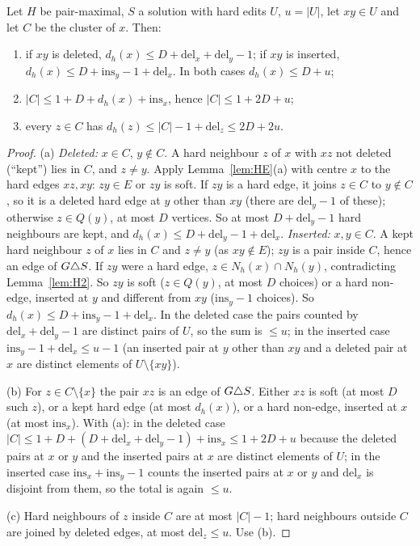\begin{lemma}\label{lem:EX}
Let $H$ be pair-maximal, $S$ a solution with hard edits $U$, $u=|U|$, let $xy\in U$ and let $C$ be the cluster of $x$. Then:
\begin{enumerate}
\item[(a)] if $xy$ is deleted, $d_h(x)\le D+\mathrm{del}_x+\mathrm{del}_y-1$; if $xy$ is inserted, $d_h(x)\le D+\mathrm{ins}_y-1+\mathrm{del}_x$. In both cases $d_h(x)\le D+u$;
\item[(b)] $|C|\le1+D+d_h(x)+\mathrm{ins}_x$, hence $|C|\le1+2D+u$;
\item[(c)] every $z\in C$ has $d_h(z)\le|C|-1+\mathrm{del}_z\le2D+2u$.
\end{enumerate}
\end{lemma}
\begin{proof}
(a) \emph{Deleted:} $x\in C$, $y\notin C$. A hard neighbour $z$ of $x$ with $xz$ not deleted (``kept'') lies in $C$, and $z\ne y$. Apply Lemma~\ref{lem:HE}(a) with centre $x$ to the hard edges $xz,xy$: $zy\in E$ or $zy$ is soft. If $zy$ is a hard edge, it joins $z\in C$ to $y\notin C$, so it is a deleted hard edge at $y$ other than $xy$ (there are $\mathrm{del}_y-1$ of these); otherwise $z\in Q(y)$, at most $D$ vertices. So at most $D+\mathrm{del}_y-1$ hard neighbours are kept, and $d_h(x)\le D+\mathrm{del}_y-1+\mathrm{del}_x$. \emph{Inserted:} $x,y\in C$. A kept hard neighbour $z$ of $x$ lies in $C$ and $z\ne y$ (as $xy\notin E$); $zy$ is a pair inside $C$, hence an edge of $G\triangle S$. If $zy$ were a hard edge, $z\in N_h(x)\cap N_h(y)$, contradicting Lemma~\ref{lem:H2}. So $zy$ is soft ($z\in Q(y)$, at most $D$ choices) or a hard non-edge, inserted at $y$ and different from $xy$ ($\mathrm{ins}_y-1$ choices). So $d_h(x)\le D+\mathrm{ins}_y-1+\mathrm{del}_x$. In the deleted case the pairs counted by $\mathrm{del}_x+\mathrm{del}_y-1$ are distinct pairs of $U$, so the sum is $\le u$; in the inserted case $\mathrm{ins}_y-1+\mathrm{del}_x\le u-1$ (an inserted pair at $y$ other than $xy$ and a deleted pair at $x$ are distinct elements of $U\setminus\{xy\}$).

(b) For $z\in C\setminus\{x\}$ the pair $xz$ is an edge of $G\triangle S$. Either $xz$ is soft (at most $D$ such $z$), or a kept hard edge (at most $d_h(x)$), or a hard non-edge, inserted at $x$ (at most $\mathrm{ins}_x$). With (a): in the deleted case $|C|\le1+D+(D+\mathrm{del}_x+\mathrm{del}_y-1)+\mathrm{ins}_x\le1+2D+u$ because the deleted pairs at $x$ or $y$ and the inserted pairs at $x$ are distinct elements of $U$; in the inserted case $\mathrm{ins}_x+\mathrm{ins}_y-1$ counts the inserted pairs at $x$ or $y$ and $\mathrm{del}_x$ is disjoint from them, so the total is again $\le u$.

(c) Hard neighbours of $z$ inside $C$ are at most $|C|-1$; hard neighbours outside $C$ are joined by deleted edges, at most $\mathrm{del}_z\le u$. Use (b).
\end{proof}

